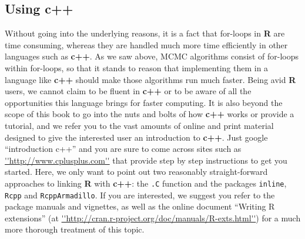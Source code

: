 \subsection{Using {\bf c++}}
Without going into the underlying reasons, it is a fact that for-loops in {\bf R} are time consuming, whereas they are handled much more time efficiently in other languages such as {\bf c++}. As we saw above, MCMC algorithms consist of for-loops within for-loops, so that it stands to reason that implementing them in a language like {\bf c++} should make those algorithms run much faster. Being avid {\bf R} users, we cannot claim to be fluent in {\bf c++} or to be aware of all the opportunities this language brings for faster computing. It is also beyond the scope of this book to go into the nuts and bolts of how {\bf c++} works or provide a tutorial, and we refer you to the vast amounts of online and print material designed to give the interested user an introduction to {\bf c++}. Just google ``introduction c++'' and you are sure to come across sites such as \url{''http://www.cplusplus.com''} that provide step by step instructions to get you started. Here, we only want to point out two reasonably straight-forward approaches to linking {\bf R} with {\bf c++}: the {\tt .C} function and the packages {\tt inline}, {\tt Rcpp} and {\tt RcppArmadillo}. If you are interested, we suggest you refer to the package manuals and vignettes, as well as the online document ``Writing R extensions'' (at \url{''http://cran.r-project.org/doc/manuals/R-exts.html''}) for a much more thorough treatment of this topic.

